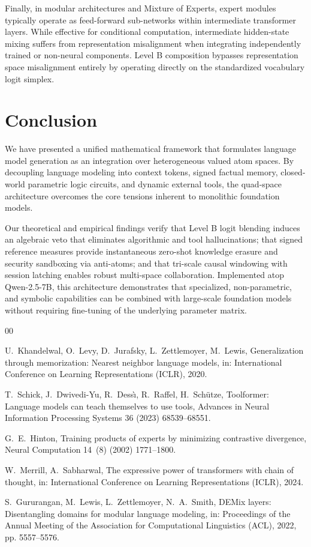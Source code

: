\documentclass[preprint,12pt]{elsarticle}
\begin{document}
Finally, in modular architectures and Mixture of Experts, expert modules typically operate as feed-forward sub-networks within intermediate transformer layers. While effective for conditional computation, intermediate hidden-state mixing suffers from representation misalignment when integrating independently trained or non-neural components. Level B composition bypasses representation space misalignment entirely by operating directly on the standardized vocabulary logit simplex.

\section{Conclusion}

We have presented a unified mathematical framework that formulates language model generation as an integration over heterogeneous valued atom spaces. By decoupling language modeling into context tokens, signed factual memory, closed-world parametric logic circuits, and dynamic external tools, the quad-space architecture overcomes the core tensions inherent to monolithic foundation models. 

Our theoretical and empirical findings verify that Level B logit blending induces an algebraic veto that eliminates algorithmic and tool hallucinations; that signed reference measures provide instantaneous zero-shot knowledge erasure and security sandboxing via anti-atoms; and that tri-scale causal windowing with session latching enables robust multi-space collaboration. Implemented atop Qwen-2.5-7B, this architecture demonstrates that specialized, non-parametric, and symbolic capabilities can be combined with large-scale foundation models without requiring fine-tuning of the underlying parameter matrix.

\begin{thebibliography}{00}

U.~Khandelwal, O.~Levy, D.~Jurafsky, L.~Zettlemoyer, M.~Lewis,
Generalization through memorization: Nearest neighbor language models,
in: International Conference on Learning Representations (ICLR), 2020.

T.~Schick, J.~Dwivedi-Yu, R.~Dess{\`\i}, R.~Raffel, H.~Sch{\"u}tze,
Toolformer: Language models can teach themselves to use tools,
Advances in Neural Information Processing Systems 36 (2023) 68539--68551.

G.~E.~Hinton,
Training products of experts by minimizing contrastive divergence,
Neural Computation 14~(8) (2002) 1771--1800.

W.~Merrill, A.~Sabharwal,
The expressive power of transformers with chain of thought,
in: International Conference on Learning Representations (ICLR), 2024.

S.~Gururangan, M.~Lewis, L.~Zettlemoyer, N.~A.~Smith,
DEMix layers: Disentangling domains for modular language modeling,
in: Proceedings of the Annual Meeting of the Association for Computational Linguistics (ACL), 2022, pp. 5557--5576.

\end{thebibliography}
\end{document}
